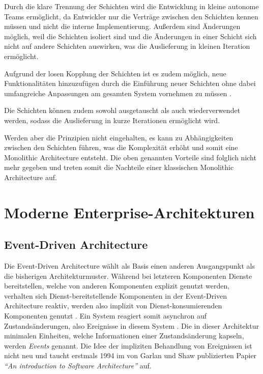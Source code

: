 \documentclass[acmtog]{acmart}
\begin{document}
Durch die klare Trennung der Schichten wird die Entwicklung in kleine autonome Teams ermöglicht,
 da Entwickler nur die Verträge zwischen den Schichten kennen müssen und nicht die interne Implementierung.
Außerdem sind Änderungen möglich, weil die Schichten isoliert sind und die Änderungen in einer Schicht
 sich nicht auf andere Schichten auswirken, was die Auslieferung in kleinen Iteration ermöglicht.

Aufgrund der losen Kopplung der Schichten ist es zudem möglich, neue Funktionalitäten
hinzuzufügen durch die Einführung neuer Schichten ohne dabei umfangreiche Anpassungen am gesamten
System vornehmen zu müssen \cite[35]{layered2}.

Die Schichten können zudem sowohl ausgetauscht als auch wiederverwendet werden, sodass
 die Auslieferung in kurze Iterationen ermöglicht wird.

Werden aber die Prinzipien nicht eingehalten, es kann zu Abhängigkeiten zwischen den Schichten
führen, was die Komplexität erhöht und somit eine Monolithic Architecture entsteht.
Die oben genannten Vorteile sind folglich nicht mehr gegeben und treten somit die Nachteile einer
klassischen Monolithic Architecture auf. \cite[5]{layered4}


\section{Moderne Enterprise-Architekturen}

\subsection{Event-Driven Architecture}
Die Event-Driven Architecture wählt als Basis einen anderen Ausgangspunkt als die bisherigen Architekturmuster.
Während bei letzteren Komponenten Dienste bereitstellen, welche von anderen Komponenten explizit genutzt werden,
verhalten sich Dienst-bereitstellende Komponenten in der Event-Driven Architecture reaktiv,
werden also implizit von Dienst-konsumierenden Komponenten genutzt \cite{garlanShawImplizit}.
Ein System reagiert somit asynchron auf Zustandsänderungen, also Ereignisse in diesem System \cite{eda}.
Die in dieser Architektur minimalen Einheiten, welche Informationen einer Zustandsänderung kapseln, werden \textit{Events} genannt.
Die Idee der impliziten Behandlung von Ereignissen ist nicht neu und taucht erstmals 1994 im von Garlan und Shaw publizierten Papier
\textit{\enquote{An introduction to Software Architecture}} auf.
\end{document}
